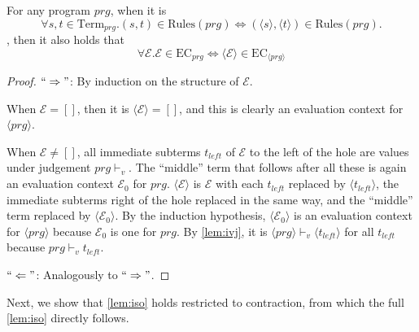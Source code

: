 \begin{lemma}
\label{lem:iec}
For any program $prg$, when it is
\[
\forall s,t \in \textrm{Term}_{prg}. (s, t) \in \textrm{Rules}(prg) \iff (\langle s \rangle, \langle t \rangle) \in \textrm{Rules}(prg).
\]
, then it also holds that
\[
\forall \mathcal{E}. \mathcal{E} \in \textrm{EC}_{prg} \iff \langle \mathcal{E} \rangle \in \textrm{EC}_{\langle prg \rangle}
\]
\begin{proof}
$``\Rightarrow"$: By induction on the structure of $\mathcal{E}$.

When $\mathcal{E} = []$, then it is $\langle \mathcal{E} \rangle = []$, and this is clearly an evaluation context for $\langle prg \rangle$.

When $\mathcal{E} \neq []$, all immediate subterms $t_{left}$ of $\mathcal{E}$ to the left of the hole are values under judgement $prg \vdash_v$. The ``middle'' term that follows after all these is again an evaluation context $\mathcal{E}_0$ for $prg$. $\langle \mathcal{E} \rangle$ is $\mathcal{E}$ with each $t_{left}$ replaced by $\langle t_{left} \rangle$, the immediate subterms right of the hole replaced in the same way, and the ``middle'' term replaced by $\langle \mathcal{E}_0 \rangle$. By the induction hypothesis, $\langle \mathcal{E}_0 \rangle$ is an evaluation context for $\langle prg \rangle$ because $\mathcal{E}_0$ is one for $prg$. By \autoref{lem:ivj}, it is $\langle prg \rangle \vdash_v \langle t_{left} \rangle$ for all $t_{left}$ because $prg \vdash_v t_{left}$.

$``\Leftarrow"$: Analogously to $``\Rightarrow"$.
\end{proof}
\end{lemma}

Next, we show that \autoref{lem:iso} holds restricted to contraction, from which the full \autoref{lem:iso} directly follows.

